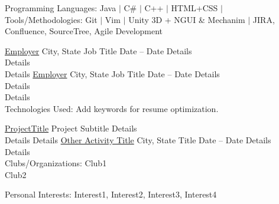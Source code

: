 \documentclass[10pt,a4paper]{article}
\newcommand{\dotfillshr}{\vspace{-0.8em}\dotfill}
\begin{document}
\begin{center}
\vspace{-1.0em}
\dotfillshr

\inlineheadsection  %
  {Programming Languages:}
  {Java $|$ C\# $|$ C++ $|$ HTML+CSS $|$ }
  \vspace{0.6em}
  \inlineheadsection
  {Tools/Methodologies:}
  { Git $|$ Vim $|$ Unity 3D + NGUI \& Mechanim $|$ JIRA, Confluence, SourceTree, Agile Development }
  \vspace{0.6em}

\vspace{-0.5 em}
\dotfillshr


\headedsection  %
  {\href{http://www.company.com}{Employer}}
  {{City, State}}
{%
  \headedsubsection
    {Job Title}
    {Date -- Date}
    {
    \bodytext
    {
      \sbull Details\\ 
      \sbull Details \\
      \sbull Details
    }
  }
}
\headedsection  %
  {\href{http://www.company.com}{Employer}}
  {{City, State}} {%
  \headedsubsection
    {Job Title}
    {Date -- Date}
    {
    \bodytext
    {
      \sbull Details\\
      \sbull Details \\
      \sbull Details\\
    Technologies Used: Add keywords for resume optimization.
    }
  } 
}


\vspace{-1.0em}
\dotfillshr
\headedsection
  {\href{www.projectlinkhere.com}{ProjectTitle}}
  {\textsc{}} {%
  \headedsubsection
    {Project Subtitle}
    {} 
    {
      \bodytext
      {
        \sbull Details\\ 
        \sbull Details
        \sbull Details
      }
    }
  }
\headedsection  %
  {\href{http://weburl.com/}{Other Activity Title}}
  {{City, State}} {%
  \headedsubsection
    {Title}
    {Date -- Date}
    {
      \bodytext
      {
        \sbull Details\\ 
        \sbull Details\\ 
      }
    }
  }
\vspace{-1.0em}
\dotfillshr
 \inlineheadsection
  {Clubs/Organizations:}
  { 
    \hfill \break 
    Club1\\
    Club2\\
  }
  \vspace{0.6em}
  
\inlineheadsection
{Personal Interests:}
{ Interest1, Interest2, Interest3, Interest4}
  
\vspace{1.5em}

  
\end{center}
\end{document}
